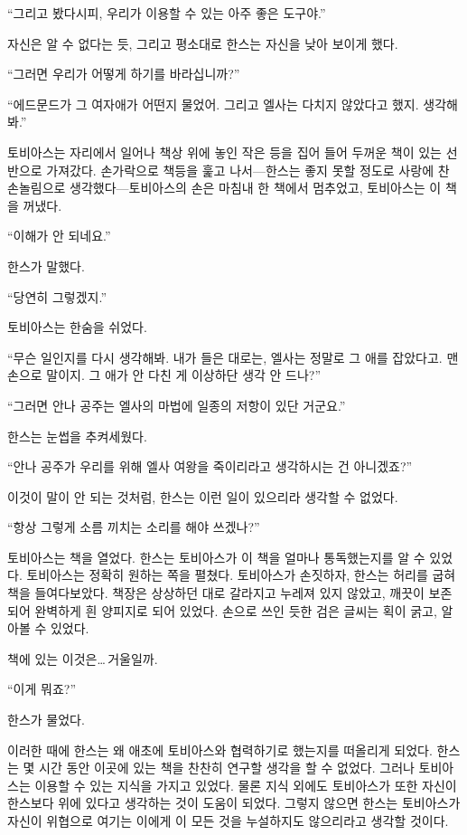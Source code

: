 ``그리고 봤다시피, 우리가 이용할 수 있는 아주 좋은 도구야.''

자신은 알 수 없다는 듯, 그리고 평소대로 한스는 자신을 낮아 보이게 했다.

``그러면 우리가 어떻게 하기를 바라십니까?''

``에드문드가 그 여자애가 어떤지 물었어. 그리고 엘사는 다치지 않았다고 했지. 생각해 봐.''

토비아스는 자리에서 일어나 책상 위에 놓인 작은 등을 집어 들어 두꺼운 책이 있는 선반으로 가져갔다. 손가락으로 책등을 훑고 나서—한스는 좋지 못할 정도로 사랑에 찬 손놀림으로 생각했다—토비아스의 손은 마침내 한 책에서 멈추었고, 토비아스는 이 책을 꺼냈다.

``이해가 안 되네요.''

한스가 말했다.

``당연히 그렇겠지.''

토비아스는 한숨을 쉬었다.

``무슨 일인지를 다시 생각해봐. 내가 들은 대로는, 엘사는 정말로 그 애를 잡았다고. 맨손으로 말이지. 그 애가 안 다친 게 이상하단 생각 안 드나?''

``그러면 안나 공주는 엘사의 마법에 일종의 저항이 있단 거군요.''

한스는 눈썹을 추켜세웠다.

``안나 공주가 우리를 위해 엘사 여왕을 죽이리라고 생각하시는 건 아니겠죠?''

이것이 말이 안 되는 것처럼, 한스는 이런 일이 있으리라 생각할 수 없었다.

``항상 그렇게 소름 끼치는 소리를 해야 쓰겠나?''

토비아스는 책을 열었다. 한스는 토비아스가 이 책을 얼마나 통독했는지를 알 수 있었다. 토비아스는 정확히 원하는 쪽을 펼쳤다. 토비아스가 손짓하자, 한스는 허리를 굽혀 책을 들여다보았다. 책장은 상상하던 대로 갈라지고 누레져 있지 않았고, 깨끗이 보존되어 완벽하게 흰 양피지로 되어 있었다. 손으로 쓰인 듯한 검은 글씨는 획이 굵고, 알아볼 수 있었다.

책에 있는 이것은\ldots\,거울일까.

``이게 뭐죠?''

한스가 물었다.

이러한 때에 한스는 왜 애초에 토비아스와 협력하기로 했는지를 떠올리게 되었다. 한스는 몇 시간 동안 이곳에 있는 책을 찬찬히 연구할 생각을 할 수 없었다. 그러나 토비아스는 이용할 수 있는 지식을 가지고 있었다. 물론 지식 외에도 토비아스가 또한 자신이 한스보다 위에 있다고 생각하는 것이 도움이 되었다. 그렇지 않으면 한스는 토비아스가 자신이 위협으로 여기는 이에게 이 모든 것을 누설하지도 않으리라고 생각할 것이다.

